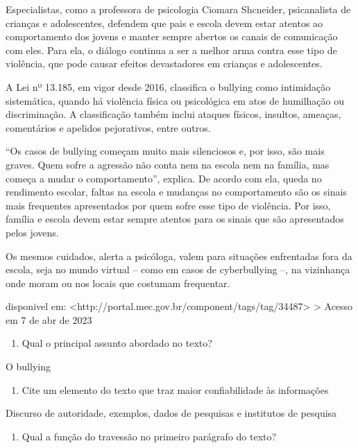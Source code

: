 Especialistas, como a professora de psicologia Ciomara Shcneider,
psicanalista de crianças e adolescentes, defendem que pais e escola
devem estar atentos ao comportamento dos jovens e manter sempre abertos
os canais de comunicação com eles. Para ela, o diálogo continua a ser a
melhor arma contra esse tipo de violência, que pode causar efeitos
devastadores em crianças e adolescentes.

A Lei nº 13.185, em vigor desde 2016, classifica o bullying como
intimidação sistemática, quando há violência física ou psicológica em
atos de humilhação ou discriminação. A classificação também inclui
ataques físicos, insultos, ameaças, comentários e apelidos pejorativos,
entre outros.

``Os casos de bullying começam muito mais silenciosos e, por isso, são
mais graves. Quem sofre a agressão não conta nem na escola nem na
família, mas começa a mudar o comportamento'', explica. De acordo com
ela, queda no rendimento escolar, faltas na escola e mudanças no
comportamento são os sinais mais frequentes apresentados por quem sofre
esse tipo de violência. Por isso, família e escola devem estar sempre
atentos para os sinais que são apresentados pelos jovens.

Os mesmos cuidados, alerta a psicóloga, valem para situações enfrentadas
fora da escola, seja no mundo virtual -- como em casos de cyberbullying
--, na vizinhança onde moram ou nos locais que costumam frequentar.

disponivel em:
\textless http://portal.mec.gov.br/component/tags/tag/34487\textgreater{}
\textgreater{} Acesso em 7 de abr de 2023

\begin{enumerate}
\def\labelenumi{\arabic{enumi})}
\tightlist
\item
  Qual o principal assunto abordado no texto?
\end{enumerate}

O bullying

\begin{enumerate}
\def\labelenumi{\arabic{enumi})}
\setcounter{enumi}{1}
\tightlist
\item
  Cite um elemento do texto que traz maior confiabilidade às informações
\end{enumerate}

Discurso de autoridade, exemplos, dados de pesquisas e institutos de
pesquisa

\begin{enumerate}
\def\labelenumi{\arabic{enumi})}
\setcounter{enumi}{2}
\tightlist
\item
  Qual a função do travessão no primeiro parágrafo do texto?
\end{enumerate}

